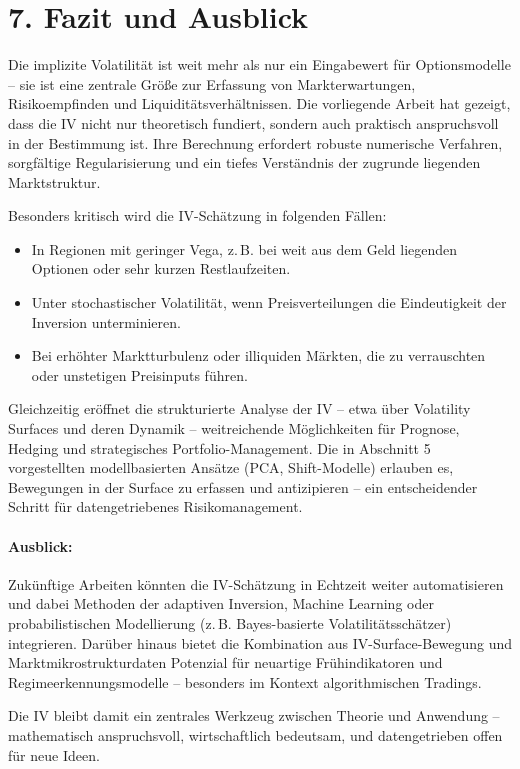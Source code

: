 \documentclass[a4paper,12pt]{article}
\begin{document}
\section*{7. Fazit und Ausblick}

Die implizite Volatilität ist weit mehr als nur ein Eingabewert für Optionsmodelle – sie ist eine zentrale Größe zur Erfassung von Markterwartungen, Risikoempfinden und Liquiditätsverhältnissen. Die vorliegende Arbeit hat gezeigt, dass die IV nicht nur theoretisch fundiert, sondern auch praktisch anspruchsvoll in der Bestimmung ist. Ihre Berechnung erfordert robuste numerische Verfahren, sorgfältige Regularisierung und ein tiefes Verständnis der zugrunde liegenden Marktstruktur.

Besonders kritisch wird die IV-Schätzung in folgenden Fällen:
\begin{itemize}
  \item In Regionen mit geringer Vega, z.\,B. bei weit aus dem Geld liegenden Optionen oder sehr kurzen Restlaufzeiten.
  \item Unter stochastischer Volatilität, wenn Preisverteilungen die Eindeutigkeit der Inversion unterminieren.
  \item Bei erhöhter Marktturbulenz oder illiquiden Märkten, die zu verrauschten oder unstetigen Preisinputs führen.
\end{itemize}

Gleichzeitig eröffnet die strukturierte Analyse der IV – etwa über Volatility Surfaces und deren Dynamik – weitreichende Möglichkeiten für Prognose, Hedging und strategisches Portfolio-Management. Die in Abschnitt 5 vorgestellten modellbasierten Ansätze (PCA, Shift-Modelle) erlauben es, Bewegungen in der Surface zu erfassen und antizipieren – ein entscheidender Schritt für datengetriebenes Risikomanagement.

\paragraph{Ausblick:}
Zukünftige Arbeiten könnten die IV-Schätzung in Echtzeit weiter automatisieren und dabei Methoden der adaptiven Inversion, Machine Learning oder probabilistischen Modellierung (z.\,B. Bayes-basierte Volatilitätsschätzer) integrieren. Darüber hinaus bietet die Kombination aus IV-Surface-Bewegung und Marktmikrostrukturdaten Potenzial für neuartige Frühindikatoren und Regimeerkennungsmodelle – besonders im Kontext algorithmischen Tradings.

Die IV bleibt damit ein zentrales Werkzeug zwischen Theorie und Anwendung – mathematisch anspruchsvoll, wirtschaftlich bedeutsam, und datengetrieben offen für neue Ideen.
\end{document}

